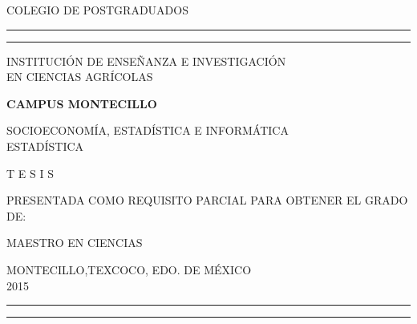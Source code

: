 \begin{minipage}[c][1\totalheight][s]{13.5cm}
  \begin{center}
    {\huge COLEGIO DE POSTGRADUADOS}
    \vspace{.3cm}
    \hrule height2pt
    \vspace{.1cm}
    \hrule height1pt
    \vspace{.8cm}
    {\large INSTITUCIÓN DE ENSEÑANZA E INVESTIGACIÓN\\EN CIENCIAS AGRÍCOLAS}


    \vspace{1.5cm}
    {\large \textbf{CAMPUS MONTECILLO}}

    \vspace{1.5cm}
    {SOCIOECONOMÍA, ESTADÍSTICA E INFORMÁTICA\\ESTADÍSTICA}

    \vspace{1.5cm}
    {\large \textbf{\eltitulo}}

    \vspace{1.5cm}
    {\large \elautor}

    \vspace{1.5cm}
    {\Large T E S I S}

    \vspace{1.5cm}
    {\large PRESENTADA COMO REQUISITO PARCIAL}
    {\large PARA OBTENER EL GRADO DE:}

    \vspace{1.5cm}
    {\Large MAESTRO EN CIENCIAS}

    \vspace{1.71cm}
    {\large{MONTECILLO,TEXCOCO, EDO. DE MÉXICO\\2015}}
    \vspace{0.5cm}

    {\hskip-2.4cm
       \begin{minipage}[c][1\totalheight][s]{16.5cm}
         \hrule width15cm height1pt\vskip1mm
         \hrule width15cm height2pt
       \end{minipage}
    }
  \end{center}
\end{minipage}

\endinput 
